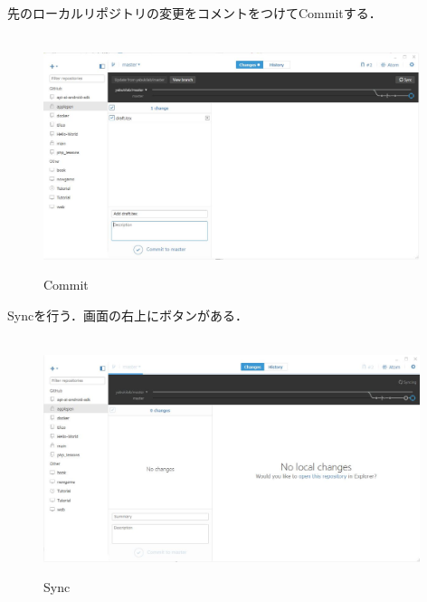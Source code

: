 \newpage

先のローカルリポジトリの変更をコメントをつけてCommitする．
\begin{figure}
\centering　
\includegraphics[width=11cm]{22.JPG}
\caption{Commit}\label{tab:uac}
\end{figure}

\newpage

Syncを行う．画面の右上にボタンがある．
\begin{figure}
\centering　
\includegraphics[width=11cm]{23.JPG}
\caption{Sync}\label{tab:uac}
\end{figure}

